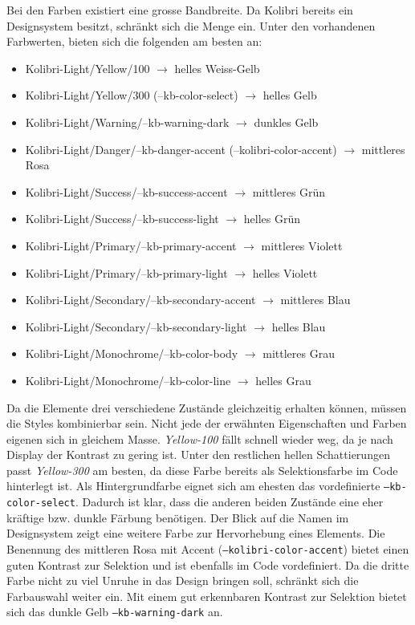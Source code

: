 Bei den Farben existiert eine grosse Bandbreite.
Da Kolibri bereits ein Designsystem besitzt, schränkt sich die Menge ein.
Unter den vorhandenen Farbwerten, bieten sich die folgenden am besten an:

\begin{itemize}
    \item Kolibri-Light/Yellow/100 $\rightarrow$ helles Weiss-Gelb
    \item Kolibri-Light/Yellow/300 (--kb-color-select) $\rightarrow$ helles Gelb
    \item Kolibri-Light/Warning/--kb-warning-dark $\rightarrow$ dunkles Gelb
    \item Kolibri-Light/Danger/--kb-danger-accent (--kolibri-color-accent) $\rightarrow$ mittleres Rosa
    \item Kolibri-Light/Success/--kb-success-accent $\rightarrow$ mittleres Grün
    \item Kolibri-Light/Success/--kb-success-light $\rightarrow$ helles Grün
    \item Kolibri-Light/Primary/--kb-primary-accent $\rightarrow$ mittleres Violett
    \item Kolibri-Light/Primary/--kb-primary-light $\rightarrow$ helles Violett
    \item Kolibri-Light/Secondary/--kb-secondary-accent $\rightarrow$ mittleres Blau
    \item Kolibri-Light/Secondary/--kb-secondary-light $\rightarrow$ helles Blau
    \item Kolibri-Light/Monochrome/--kb-color-body $\rightarrow$ mittleres Grau
    \item Kolibri-Light/Monochrome/--kb-color-line $\rightarrow$ helles Grau
\end{itemize}

Da die Elemente drei verschiedene Zustände gleichzeitig erhalten können, müssen die Styles kombinierbar sein.
Nicht jede der erwähnten Eigenschaften und Farben eigenen sich in gleichem Masse.
\emph{Yellow-100} fällt schnell wieder weg, da je nach Display der Kontrast zu gering ist.
Unter den restlichen hellen Schattierungen passt \emph{Yellow-300} am besten, da diese Farbe bereits als Selektionsfarbe im Code hinterlegt ist.
Als Hintergrundfarbe eignet sich am ehesten das vordefinierte \texttt{--kb-color-select}. 
Dadurch ist klar, dass die anderen beiden Zustände eine eher kräftige bzw. dunkle Färbung benötigen.
Der Blick auf die Namen im Designsystem zeigt eine weitere Farbe zur Hervorhebung eines Elements.
Die Benennung des mittleren Rosa mit Accent (\texttt{--kolibri-color-accent}) bietet einen guten Kontrast zur Selektion und ist ebenfalls im Code vordefiniert.
Da die dritte Farbe nicht zu viel Unruhe in das Design bringen soll, schränkt sich die Farbauswahl weiter ein.
Mit einem gut erkennbaren Kontrast zur Selektion bietet sich das dunkle Gelb \texttt{--kb-warning-dark} an.

